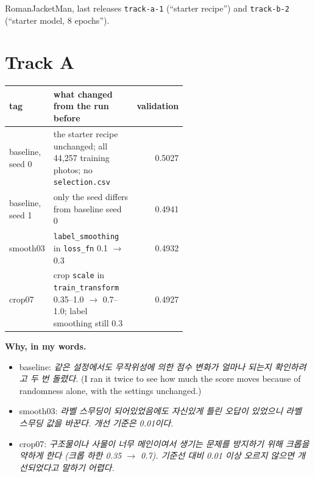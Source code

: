\documentclass[11pt]{article}
\begin{document}
\makeheader

RomanJacketMan, last releases
\texttt{track-a-1} (``starter recipe'') and \texttt{track-b-2} (``starter model,
8 epochs'').


\section*{Track A}

\begin{center}\footnotesize
\begin{tabular}{lp{0.58\linewidth}r}
\toprule
tag & what changed from the run before & validation \\
\midrule
baseline, seed 0 & the starter recipe unchanged; all 44{,}257 training photos;
  no \texttt{selection.csv} & 0.5027 \\
baseline, seed 1 & only the seed differs from baseline seed 0 & 0.4941 \\
smooth03 & \texttt{label\_smoothing} in \texttt{loss\_fn} 0.1 $\to$ 0.3 & 0.4932 \\
crop07 & crop \texttt{scale} in \texttt{train\_transform} 0.35--1.0 $\to$
  0.7--1.0; label smoothing still 0.3 & 0.4927 \\
\bottomrule
\end{tabular}
\end{center}

\textbf{Why, in my words.}
\begin{itemize}
\item baseline: \emph{같은 설정에서도 무작위성에 의한 점수 변화가 얼마나 되는지
  확인하려고 두 번 돌렸다.} (I ran it twice to see how much the score moves
  because of randomness alone, with the settings unchanged.)
\item smooth03: \emph{라벨 스무딩이 되어있었음에도 자신있게 틀린 오답이 있었으니
  라벨 스무딩 값을 바꾼다. 개선 기준은 0.01이다.}
\item crop07: \emph{구조물이나 사물이 너무 메인이여서 생기는 문제를 방지하기 위해
  크롭을 약하게 한다 (크롭 하한 0.35 $\to$ 0.7). 기준선 대비 0.01 이상 오르지
  않으면 개선되었다고 말하기 어렵다.}
\end{itemize}
\end{document}
